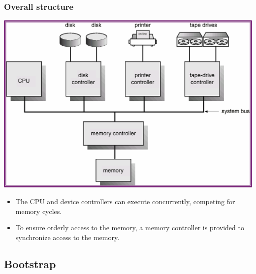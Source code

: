 \documentclass[CJKutf8,xcolor=pdftex,dvipsnames,table]{beamer}
\begin{document}
\begin{CJK*}{UTF8}{song}
  \begin{frame}
    \frametitle{Overall structure} \pause
    \begin{center}
      \includegraphics[scale=.35]{v6f2-1} \pause
    \end{center}
    \begin{itemize}
    \item{The CPU and device controllers can execute concurrently, competing for memory cycles.} \pause
    \item{To ensure orderly access to the memory, a memory controller is provided to synchronize access to the memory.}
    \end{itemize}
  \end{frame}

  \subsection{Bootstrap}


\end{CJK*}
\end{document}
